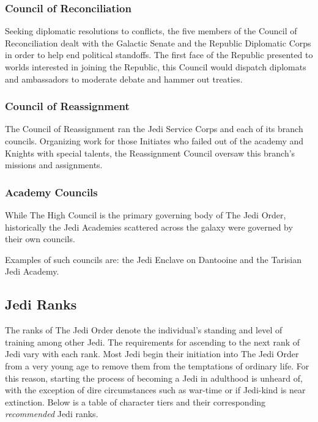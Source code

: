\documentclass[a4paper,10pt,final,twocolumn,oneside]{book}
\begin{document}
\subsubsection{Council of Reconciliation}

Seeking diplomatic resolutions to conflicts, the five members of the Council of Reconciliation dealt with the Galactic Senate and the Republic Diplomatic Corps in order to help end political standoffs. The first face of the Republic presented to worlds interested in joining the Republic, this Council would dispatch diplomats and ambassadors to moderate debate and hammer out treaties.

\subsubsection{Council of Reassignment}

The Council of Reassignment ran the Jedi Service Corps and each of its branch councils. Organizing work for those Initiates who failed out of the academy and Knights with special talents, the Reassignment Council oversaw this branch's missions and assignments.

\subsubsection{Academy Councils}

While The High Council is the primary governing body of The Jedi Order, historically the Jedi Academies scattered across the galaxy were governed by their own councils.

Examples of such councils are: the Jedi Enclave on Dantooine and the Tarisian Jedi Academy.


\subsection{Jedi Ranks} %
\label{sub:jedi_ranks}

The ranks of The Jedi Order denote the individual's standing and level of training among other Jedi. The requirements for ascending to the next rank of Jedi vary with each rank. Most Jedi begin their initiation into The Jedi Order from a very young age to remove them from the temptations of ordinary life. For this reason, starting the process of becoming a Jedi in adulthood is unheard of, with the exception of dire circumstances such as war-time or if Jedi-kind is near extinction. Below is a table of character tiers and their corresponding \textit{recommended} Jedi ranks.
\end{document}
